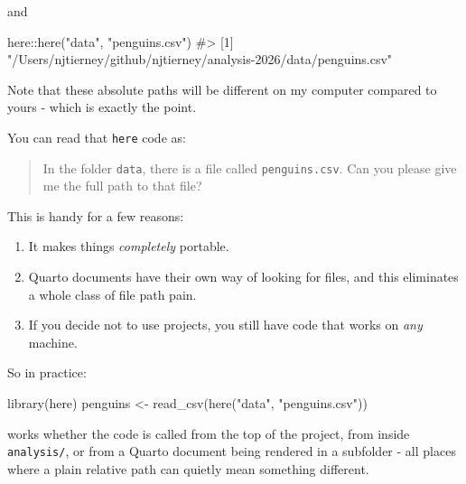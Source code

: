 \documentclass[
  letterpaper,
  justified,
  a4paper]{tufte-book}
\makeatletter
\newenvironment{Shaded}{\begin{snugshade}}{\end{snugshade}}
\newcommand{\CommentTok}[1]{\textcolor[rgb]{0.37,0.37,0.37}{#1}}
\newcommand{\FunctionTok}[1]{\textcolor[rgb]{0.28,0.35,0.67}{#1}}
\newcommand{\NormalTok}[1]{\textcolor[rgb]{0.00,0.23,0.31}{#1}}
\newcommand{\OtherTok}[1]{\textcolor[rgb]{0.00,0.23,0.31}{#1}}
\newcommand{\SpecialCharTok}[1]{\textcolor[rgb]{0.37,0.37,0.37}{#1}}
\newcommand{\StringTok}[1]{\textcolor[rgb]{0.13,0.47,0.30}{#1}}
\providecommand{\tightlist}{%
  \setlength{\itemsep}{0pt}\setlength{\parskip}{0pt}}
\providecommand{\tightlist}{%
  \setlength{\itemsep}{0pt}\setlength{\parskip}{0pt}}
\let\rbporigShaded\Shaded
\let\rbporigendShaded\endShaded
\renewenvironment{Shaded}{%
  \begingroup
  \ifdim\linewidth=\rbpbodywidth
    \advance\linewidth by \@tufte@overhang
    \advance\hsize by \@tufte@overhang
    \advance\columnwidth by \@tufte@overhang
  \fi
  \rbporigShaded
}{%
  \rbporigendShaded
  \endgroup
}
\makeatother
\begin{document}
and

\begin{Shaded}
\begin{Highlighting}[]
\NormalTok{here}\SpecialCharTok{::}\FunctionTok{here}\NormalTok{(}\StringTok{"data"}\NormalTok{, }\StringTok{"penguins.csv"}\NormalTok{)}
\CommentTok{\#\textgreater{} [1] "/Users/njtierney/github/njtierney/analysis{-}2026/data/penguins.csv"}
\end{Highlighting}
\end{Shaded}

Note that these absolute paths will be different on my computer compared
to yours - which is exactly the point.

You can read that \texttt{here} code as:

\begin{quote}
In the folder \texttt{data}, there is a file called
\texttt{penguins.csv}. Can you please give me the full path to that
file?
\end{quote}

This is handy for a few reasons:

\begin{enumerate}
\def\labelenumi{\arabic{enumi}.}
\tightlist
\item
  It makes things \emph{completely} portable.
\item
  Quarto documents have their own way of looking for files, and this
  eliminates a whole class of file path pain.
\item
  If you decide not to use projects, you still have code that works on
  \emph{any} machine.
\end{enumerate}

So in practice:

\begin{Shaded}
\begin{Highlighting}[]
\FunctionTok{library}\NormalTok{(here)}
\NormalTok{penguins }\OtherTok{\textless{}{-}} \FunctionTok{read\_csv}\NormalTok{(}\FunctionTok{here}\NormalTok{(}\StringTok{"data"}\NormalTok{, }\StringTok{"penguins.csv"}\NormalTok{))}
\end{Highlighting}
\end{Shaded}

works whether the code is called from the top of the project, from
inside \texttt{analysis/}, or from a Quarto document being rendered in a
subfolder - all places where a plain relative path can quietly mean
something different.
\end{document}
